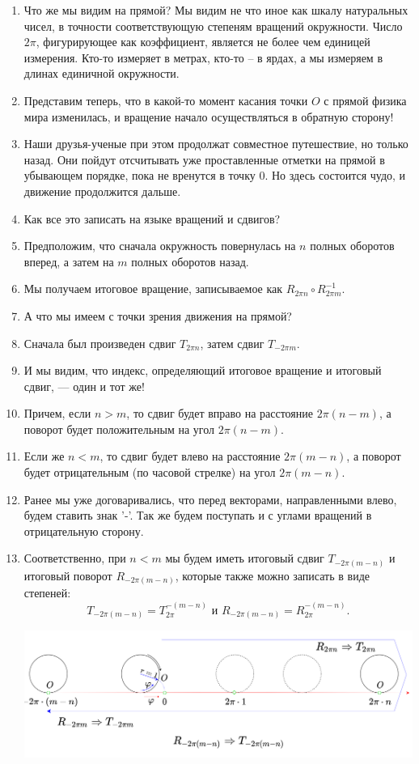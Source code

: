 \begin{enumerate}
\item Что же мы видим на прямой? Мы видим не что иное как шкалу натуральных чисел, в точности соответствующую степеням вращений окружности. Число $2\pi$, фигурирующее как коэффициент, является не более чем единицей измерения. Кто-то измеряет в метрах, кто-то -- в ярдах, а мы измеряем в длинах единичной окружности.
\item Представим теперь, что в какой-то момент касания точки $O$ с прямой физика мира изменилась, и вращение начало осуществляться в обратную сторону!
\item Наши друзья-ученые при этом продолжат совместное путешествие, но только назад. Они пойдут отсчитывать уже проставленные отметки на прямой в убывающем порядке, пока не вренутся в точку 0. Но здесь состоится чудо, и движение продолжится дальше.
\item Как все это записать на языке вращений и сдвигов?
\item Предположим, что сначала окружность повернулась на $n$ полных оборотов вперед, а затем на $m$ полных оборотов назад.
\item Мы получаем итоговое вращение, записываемое как $R_{2\pi n}\circ R_{2\pi m}^{-1}$.
\item А что мы имеем с точки зрения движения на прямой?
\item Сначала был произведен сдвиг $T_{2\pi n}$, затем сдвиг $T_{-2\pi m}$.
\item И мы видим, что индекс, определяющий итоговое вращение и итоговый сдвиг, --- один и тот же!
\item Причем, если $n>m$, то сдвиг будет вправо на расстояние $2\pi(n-m)$, а поворот будет положительным на угол $2\pi(n-m)$.
\item Если же $n<m$, то сдвиг будет влево на расстояние $2\pi(m-n)$, а поворот будет отрицательным (по часовой стрелке) на угол $2\pi(m-n)$.
\item Ранее мы уже договаривались, что перед векторами, направленными влево, будем ставить знак '-'. Так же будем поступать и с углами вращений в отрицательную сторону.
\item Соответственно, при $n<m$ мы будем иметь итоговый сдвиг $T_{-2\pi(m-n)}$ и итоговый поворот $R_{-2\pi(m-n)}$, которые также можно записать в виде степеней:
$$
T_{-2\pi(m-n)}=T_{2\pi}^{-(m-n)}\mbox{ и }R_{-2\pi(m-n)}=R_{2\pi}^{-(m-n)}.
$$

\begin{center}
\includegraphics[scale=0.15]{RundLine1.png}
\end{center}


\end{enumerate}

